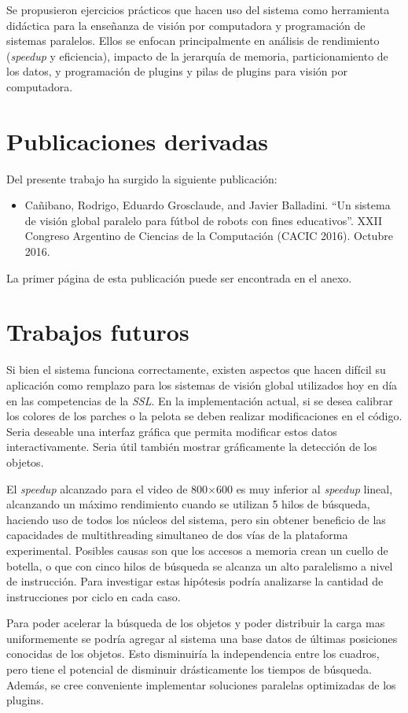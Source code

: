 Se propusieron ejercicios prácticos que hacen uso del sistema como herramienta
didáctica para la enseñanza de visión por computadora y programación de sistemas
paralelos. Ellos se enfocan principalmente en análisis de rendimiento
(\emph{speedup} y eficiencia), impacto de la jerarquía de memoria,
particionamiento de los datos, y programación de plugins y pilas de plugins para
visión por computadora.

\section{Publicaciones derivadas}

\label{publicacionesDerivadas}

Del presente trabajo ha surgido la siguiente publicación:

\begin{itemize}

	\item{Cañibano, Rodrigo, Eduardo Grosclaude, and Javier Balladini. ``Un
		sistema de visión global paralelo para fútbol de robots con
		fines educativos''. XXII Congreso Argentino de Ciencias de la
		Computación (CACIC 2016). Octubre 2016.}

\end{itemize}

La primer página de esta publicación puede ser encontrada en el anexo.

\section{Trabajos futuros}

\label{trabajosFuturos}

Si bien el sistema funciona correctamente, existen aspectos que hacen difícil su
aplicación como remplazo para los sistemas de visión global utilizados hoy en
día en las competencias de la \emph{SSL}. En la implementación actual, si se
desea calibrar los colores de los parches o la pelota se deben realizar
modificaciones en el código. Seria deseable una interfaz gráfica que permita
modificar estos datos interactivamente. Seria útil también mostrar gráficamente
la detección de los objetos.

El \emph{speedup} alcanzado para el video de 800$\times$600 es muy inferior al
\emph{speedup} lineal, alcanzando un máximo rendimiento cuando se utilizan 5
hilos de búsqueda, haciendo uso de todos los núcleos del sistema, pero sin
obtener beneficio de las capacidades de multithreading simultaneo de dos vías de
la plataforma experimental. Posibles causas son que los accesos a memoria crean
un cuello de botella, o que con cinco hilos de búsqueda se alcanza un alto
paralelismo a nivel de instrucción. Para investigar estas hipótesis podría
analizarse la cantidad de instrucciones por ciclo en cada caso.

Para poder acelerar la búsqueda de los objetos y poder distribuir la carga mas
uniformemente se podría agregar al sistema una base datos de últimas posiciones
conocidas de los objetos. Esto disminuiría la independencia entre los cuadros,
pero tiene el potencial de disminuir drásticamente los tiempos de búsqueda.
Además, se cree conveniente implementar soluciones paralelas optimizadas de los
plugins.

